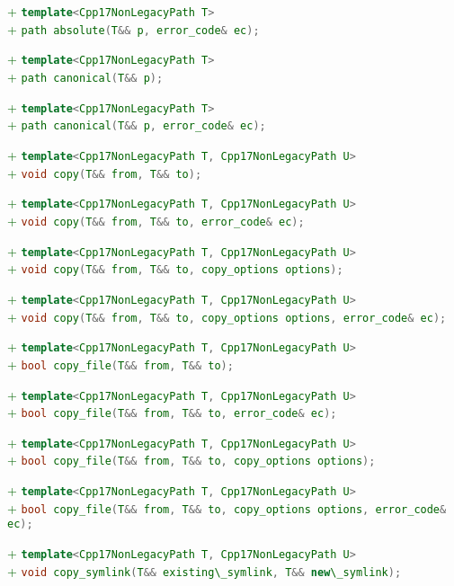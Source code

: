 \documentclass[11pt]{article}
\newcommand{\code}[2][cpp]{\lstinline[language=#1,basicstyle=\small\ttfamily]{#2}}
\newcommand{\tsreplace}[3]{\textcolor{red}{\sout{#1}}#2\textcolor{darkgreen}{#3}}
\begin{document}
\tsreplace{}{}{+ \code{template<Cpp17NonLegacyPath T>}}\\
\tsreplace{}{}{+ \code{path absolute(T&& p, error_code& ec);}}

\tsreplace{}{}{+ \code{template<Cpp17NonLegacyPath T>}}\\
\tsreplace{}{}{+ \code{path canonical(T&& p);}}

\tsreplace{}{}{+ \code{template<Cpp17NonLegacyPath T>}}\\
\tsreplace{}{}{+ \code{path canonical(T&& p, error_code& ec);}}

\tsreplace{}{}{+ \code{template<Cpp17NonLegacyPath T, Cpp17NonLegacyPath U>}}\\
\tsreplace{}{}{+ \code{void copy(T&& from, T&& to);}}

\tsreplace{}{}{+ \code{template<Cpp17NonLegacyPath T, Cpp17NonLegacyPath U>}}\\
\tsreplace{}{}{+ \code{void copy(T&& from, T&& to, error_code& ec);}}

\tsreplace{}{}{+ \code{template<Cpp17NonLegacyPath T, Cpp17NonLegacyPath U>}}\\
\tsreplace{}{}{+ \code{void copy(T&& from, T&& to, copy_options options);}}

\tsreplace{}{}{+ \code{template<Cpp17NonLegacyPath T, Cpp17NonLegacyPath U>}}\\
\tsreplace{}{}{+ \code{void copy(T&& from, T&& to, copy_options options, error_code& ec);}}

\tsreplace{}{}{+ \code{template<Cpp17NonLegacyPath T, Cpp17NonLegacyPath U>}}\\
\tsreplace{}{}{+ \code{bool copy_file(T&& from, T&& to);}}

\tsreplace{}{}{+ \code{template<Cpp17NonLegacyPath T, Cpp17NonLegacyPath U>}}\\
\tsreplace{}{}{+ \code{bool copy_file(T&& from, T&& to, error_code& ec);}}

\tsreplace{}{}{+ \code{template<Cpp17NonLegacyPath T, Cpp17NonLegacyPath U>}}\\
\tsreplace{}{}{+ \code{bool copy_file(T&& from, T&& to, copy_options options);}}

\tsreplace{}{}{+ \code{template<Cpp17NonLegacyPath T, Cpp17NonLegacyPath U>}}\\
\tsreplace{}{}{+ \code{bool copy_file(T&& from, T&& to, copy_options options, error_code& ec);}}

\tsreplace{}{}{+ \code{template<Cpp17NonLegacyPath T, Cpp17NonLegacyPath U>}}\\
\tsreplace{}{}{+ \code{void copy_symlink(T&& existing\_symlink, T&& new\_symlink);}}
\end{document}
